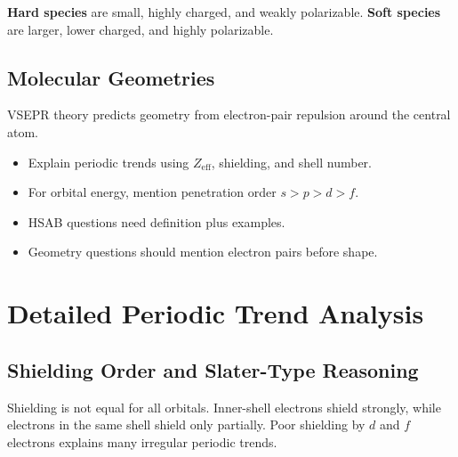 \documentclass[12pt,a4paper]{article}
\begin{document}
\begin{tcolorbox}[defbox]
\textbf{Hard species} are small, highly charged, and weakly polarizable. \textbf{Soft species} are larger, lower charged, and highly polarizable.
\end{tcolorbox}

\subsection{Molecular Geometries}
VSEPR theory predicts geometry from electron-pair repulsion around the central atom.

\begin{tcolorbox}[tikzbox, title={Common VSEPR Shapes}]
\centering
{}
\end{tcolorbox}

\begin{tcolorbox}[exambox, title={Exam Points}]
\begin{itemize}[leftmargin=*, itemsep=2pt, topsep=2pt]
  \item Explain periodic trends using $Z_{\mathrm{eff}}$, shielding, and shell number.
  \item For orbital energy, mention penetration order $s>p>d>f$.
  \item HSAB questions need definition plus examples.
  \item Geometry questions should mention electron pairs before shape.
\end{itemize}
\end{tcolorbox}

\section{Detailed Periodic Trend Analysis}

\subsection{Shielding Order and Slater-Type Reasoning}
Shielding is not equal for all orbitals. Inner-shell electrons shield strongly, while electrons in the same shell shield only partially. Poor shielding by $d$ and $f$ electrons explains many irregular periodic trends.
\end{document}
